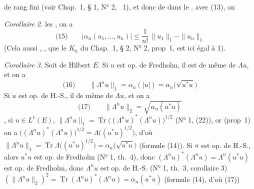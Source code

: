 \documentclass[11pt,a4paper]{article}
\begin{document}
 de rang fini  (voir Chap.~1, § 1, N° 2, ~1), et  donc    de  dans le  .    avec (13), on 

\emph{Corollaire 2.}  les  , on a
\[
  \text{(15)}\qquad |\alpha_n(u_1, \ldots, u_n)| \leq \frac{1}{n!}\, \|u_1\|_1 \cdots \|u_n\|_1
\]
(Cela  aussi \struck{\ill{}}  ,  , que le  $K_n$ du Chap.~1, § 2, N° 2, prop~1, est ici égal à 1).

\emph{Corollaire 3.} Soit     de Hilbert $E$.  Si $u$ est  op. de Fredholm, il  est de même de $\Lambda u$, et on a
\[
  \text{(16)}\qquad \|\Lambda^{n} u\|_1 = \alpha_n(|u|) = \alpha_n\bigl(\sqrt{u^{*}u}\bigr)
\]
Si $u$ est  op. de H.-S., il   de même de $\Lambda u$, et on a
\[
  \text{(17)}\qquad \|\Lambda^{n} u\|_2 = \sqrt{\alpha_n(u^{*}u)}
\]
 , si $u \in L^{1}(E)$, $\|\Lambda^{n} u\|_1 = \operatorname{Tr}\bigl((\Lambda^{n} u)^{*}(\Lambda^{n} u)\bigr)^{1/2}$ (N° 1,  (22)), or (prop~1) on a $\bigl((\Lambda^{n} u)^{*}(\Lambda^{n} u)\bigr)^{1/2} = \Lambda\bigl((u^{*}u)^{1/2}\bigr)$, d'où $\|\Lambda^{n} u\|_1 = \operatorname{Tr} \Lambda\bigl((u^{*}u)^{1/2}\bigr) = \alpha_n\bigl(\sqrt{u^{*}u}\bigr)$  (formule (14)).   Si $u$ est  op. de H.-S., alors $u^{*}u$ est  op. de Fredholm (N° 1, th.~4), donc $(\Lambda^{n} u)^{*}(\Lambda^{n} u) = \Lambda^{n}(u^{*}u)$ est  op. de Fredholm,  donc $\Lambda^{n} u$ est  op. de H.-S.    (N° 1, th.~3, corollaire 3) $(\|\Lambda^{n} u\|_2)^{2} = \operatorname{Tr}(\Lambda^{n} u)^{*}(\Lambda^{n} u) = \alpha_n(u^{*}u)$ (formule (14), d'où (17))
\end{document}
